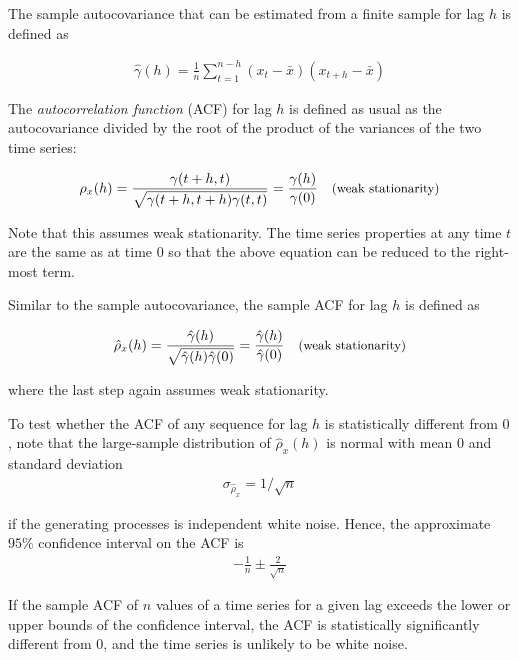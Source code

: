 The sample autocovariance that can be estimated from a finite sample for lag $h$ is defined as  

\begin{align*}
\hat{\gamma}(h)  = \frac{1}{n} \sum_{t=1}^{n-h} (x_t - \bar{x})(x_{t+h} - \bar{x})
\end{align*}

The \emph{autocorrelation function} (ACF) for lag $h$ is defined as usual as the autocovariance divided by the root of the product of the variances of the two time series:

\begin{align*}
\rho_x(h) = \frac{\gamma (t+h,t)}{\sqrt{\gamma (t+h,t+h) \gamma(t, t)}} = \frac{\gamma(h)}{\gamma(0)}  \quad \text{\small (weak stationarity)}
\end{align*}

Note that this assumes weak stationarity. The time series properties at any time $t$ are the same as at time $0$ so that the above equation can be reduced to the right-most term.

Similar to the sample autocovariance, the sample ACF for lag $h$ is defined as

\begin{align*}
\hat\rho_x(h) = \frac{\hat\gamma(h)}{\sqrt{\hat\gamma(h) \hat\gamma(0)}} = \frac{\hat\gamma(h)}{\hat\gamma(0)} \quad \text{\small (weak stationarity)}
\end{align*}

\noindent where the last step again assumes weak stationarity.

To test whether the ACF of any sequence for lag $h$ is statistically different from $0$, note that the large-sample distribution of $\hat{\rho}_{x}(h)$ is normal with mean $0$ and standard deviation
\begin{align*}
\sigma_{\hat{\rho}_{x}} = 1/ \sqrt{n} 
\end{align*}

\noindent if the generating processes is independent white noise. Hence, the approximate $95\%$ confidence interval on the ACF is
\begin{align*}
-\frac{1}{n} \pm \frac{2}{\sqrt{n}}
\end{align*}

If the sample ACF of $n$ values of a time series for a given lag exceeds the lower or upper bounds of the confidence interval, the ACF is statistically significantly different from $0$, and the time series is unlikely to be white noise.


